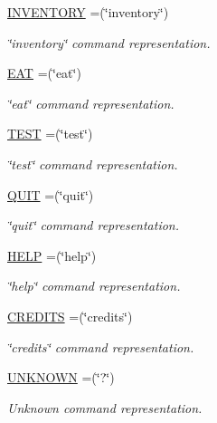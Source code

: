\begin{DoxyCompactItemize}
\hyperlink{enumpkg__parsing_1_1CommandWord_a3dace936c35682fe74dad6714af270e4}{I\-N\-V\-E\-N\-T\-O\-R\-Y} =(\char`\"{}inventory\char`\"{})
\begin{DoxyCompactList}\small\item\em \char`\"{}inventory\char`\"{} command representation. \end{DoxyCompactList}\item 
\hyperlink{enumpkg__parsing_1_1CommandWord_a4fe488aea9cdd9ed9455682d42a300b3}{E\-A\-T} =(\char`\"{}eat\char`\"{})
\begin{DoxyCompactList}\small\item\em \char`\"{}eat\char`\"{} command representation. \end{DoxyCompactList}\item 
\hyperlink{enumpkg__parsing_1_1CommandWord_acf61cb32b4d651f87b2cd342761f9a79}{T\-E\-S\-T} =(\char`\"{}test\char`\"{})
\begin{DoxyCompactList}\small\item\em \char`\"{}test\char`\"{} command representation. \end{DoxyCompactList}\item 
\hyperlink{enumpkg__parsing_1_1CommandWord_a2f645cd1791d5576f42e1fe14d202c17}{Q\-U\-I\-T} =(\char`\"{}quit\char`\"{})
\begin{DoxyCompactList}\small\item\em \char`\"{}quit\char`\"{} command representation. \end{DoxyCompactList}\item 
\hyperlink{enumpkg__parsing_1_1CommandWord_ace035a3a624f4247b9f38c24eabe3f91}{H\-E\-L\-P} =(\char`\"{}help\char`\"{})
\begin{DoxyCompactList}\small\item\em \char`\"{}help\char`\"{} command representation. \end{DoxyCompactList}\item 
\hyperlink{enumpkg__parsing_1_1CommandWord_a4267a564de4d81cec28764b1eeb3ce22}{C\-R\-E\-D\-I\-T\-S} =(\char`\"{}credits\char`\"{})
\begin{DoxyCompactList}\small\item\em \char`\"{}credits\char`\"{} command representation. \end{DoxyCompactList}\item 
\hyperlink{enumpkg__parsing_1_1CommandWord_a7a089aad12d2934da530b785a3daab49}{U\-N\-K\-N\-O\-W\-N} =(\char`\"{}?\char`\"{})
\begin{DoxyCompactList}\small\item\em Unknown command representation. \end{DoxyCompactList}\end{DoxyCompactItemize}
